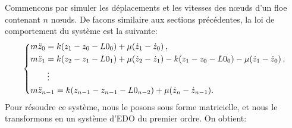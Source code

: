 Commencons par simuler les déplacements et les vitesses des n\oe{}uds d'un floe contenant $n$ n\oe{}uds. De facons similaire aux sections précédentes, la loi de comportement du système est la suivante:
\begin{align} \label{eq:multiressortsdep}
    \begin{dcases}
        m\ddot z_0 = k(z_1 - z_0 - L0_0) + \mu (\dot z_1 - \dot z_0)\, , \\
        m\ddot z_1 =  k(z_2 - z_1 - L0_1) + \mu (\dot z_2 - \dot z_1) - k(z_1 - z_0 - L0_0) - \mu (\dot z_1 - \dot z_0) \,, \\
        \qquad \vdots \\
        m\ddot z_{n-1} = k(z_{n-1} - z_{n-1} - L0_{n-2}) + \mu (\dot z_{n} - \dot z_{n-1}). 
    \end{dcases}
\end{align}
Pour résoudre ce système, nous le posons sous forme matricielle, et nous le transformons en un système d'EDO du premier ordre. On obtient:
